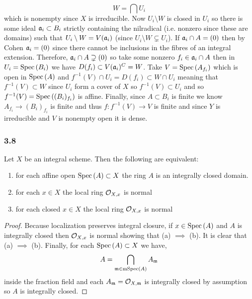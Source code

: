 \documentclass[12pt]{article}
\begin{document}
\[ W = \bigcap U_i \]
which is nonempty since $X$ is irreducible. Now $U_i \setminus W$ is closed in $U_i$ so there is some ideal $\mathfrak{a}_i \subset B_i$ strictly containing the nilradical (i.e. nonzero since these are domains) such that $U_i \setminus W = V(\mathfrak{a}_i)$ (since $U_i \setminus W \subsetneq U_i$). If $\mathfrak{a}_i \cap A = (0)$ then by Cohen $\mathfrak{a}_i = (0)$ since there cannot be inclusions in the fibres of an integral extension. Therefore, $\mathfrak{a}_i \cap A \supsetneq (0)$ so take some nonzero $f_i \in \mathfrak{a}_i \cap A$ then in $U_i = \mathrm{Spec}\left( B_i \right)$ we have $D(f_i) \subset V(\mathfrak{a}_i)^C = W$. Take $V = \mathrm{Spec}\left( A_{f_i} \right)$ which is open in $\mathrm{Spec}\left( A \right)$ and $f^{-1}(V) \cap U_i = D(f_i) \subset W \cap U_i$ meaning that $f^{-1}(V) \subset W$ since $U_i$ form a cover of $X$ so $f^{-1}(V) \subset U_i$ and so $f^{-1}(V) = \mathrm{Spec}\left( (B_i)_{f_i} \right)$ is affine. Finally, since $A \subset B_i$ is finite we know $A_{f_i} \to (B_i)_{f_i}$ is finite and thus $f : f^{-1}(V) \to V$ is finite and since $Y$ is irreducible and $V$ is nonempty open it is dense.

\subsubsection{3.8}

\begin{lemma}
Let $X$ be an integral scheme. Then the following are equivalent:
\begin{enumerate}
\item for each affine open $\mathrm{Spec}\left( A \right) \subset X$ the ring $A$ is an integrally closed domain.
\item for each $x \in X$ the local ring $\mathcal{O}_{X, x}$ is normal
\item for each closed $x \in X$ the local ring $\mathcal{O}_{X, x}$ is normal
\end{enumerate}
\end{lemma}

\begin{proof}
Because localization preserves integral closure, if $x \in \mathrm{Spec}\left( A \right)$ and $A$ is integrally closed then $\mathcal{O}_{X, x}$ is normal showing that (a) $\implies$ (b). It is clear that (a) $\implies$ (b). Finally, for each $\mathrm{Spec}\left( A \right) \subset X$ we have, 
\[ A = \bigcap_{\mathfrak{m} \in \mathrm{mSpec}\left( A \right)} A_{\mathfrak{m}} \]
inside the fraction field and each $A_{\mathfrak{m}} = \mathcal{O}_{X, \mathfrak{m}}$ is integrally closed by assumption so $A$ is integrally closed.
\end{proof}
\end{document}

